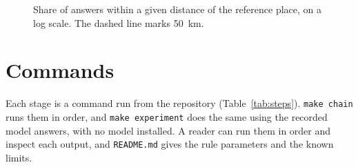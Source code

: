 \documentclass[10pt,twocolumn]{article}
\newcommand{\code}[1]{\texttt{#1}}
\begin{document}
\begin{table}[htbp]
\centering
\small

\caption{Agreement on whether each region is matched. Same outcome is the raw share; $\kappa$ corrects it for chance.}
\label{tab:kappa}
\end{table}

\begin{table}[htbp]
\centering
\small

\caption{Answers, misses beyond 50~km, the median distance of those misses, and the share of answers within each distance of the reference place.}
\label{tab:errors}
\end{table}

\begin{figure}[htbp]
\centering

\caption{Share of answers within a given distance of the reference place, on a log scale. The dashed line marks 50~km.}
\label{fig:thresholds}
\end{figure}

\begin{table}[htbp]
\centering
\small

\caption{Matches within 50~km out of answers, by vendor and method.}
\label{tab:vendors}
\end{table}

\clearpage
\section{Commands}
\label{sec:steps}

Each stage is a command run from the repository (Table~\ref{tab:steps}). \code{make chain} runs them in order, and \code{make experiment} does the same using the recorded model answers, with no model installed. A reader can run them in order and inspect each output, and \code{README.md} gives the rule parameters and the known limits.
\end{document}
